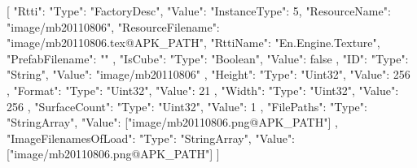 [{
        "Rtti": {
            "Type": "FactoryDesc",
            "Value": {
                "InstanceType": 5,
                "ResourceName": "image/mb20110806",
                "ResourceFilename": "image/mb20110806.tex@APK_PATH",
                "RttiName": "En.Engine.Texture",
                "PrefabFilename": ""
            }
        },
        "IsCube": {
            "Type": "Boolean",
            "Value": false
        },
        "ID": {
            "Type": "String",
            "Value": "image/mb20110806"
        },
        "Height": {
            "Type": "Uint32",
            "Value": 256
        },
        "Format": {
            "Type": "Uint32",
            "Value": 21
        },
        "Width": {
            "Type": "Uint32",
            "Value": 256
        },
        "SurfaceCount": {
            "Type": "Uint32",
            "Value": 1
        },
        "FilePaths": {
            "Type": "StringArray",
            "Value": ["image/mb20110806.png@APK_PATH"]
        },
        "ImageFilenamesOfLoad": {
            "Type": "StringArray",
            "Value": ["image/mb20110806.png@APK_PATH"]
        }
    }]